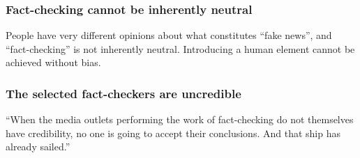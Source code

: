 \subsubsection{Fact-checking cannot be inherently neutral}

People have very different opinions about what constitutes ``fake news'', and ``fact-checking'' is not inherently neutral. Introducing a human element cannot be achieved without bias. \cite{vox_sentences_fn} \cite{inc_fb_transparency}

\subsubsection{The selected fact-checkers are uncredible}

``When the media outlets performing the work of fact-checking do not themselves have credibility, no one is going to accept their conclusions. And that ship has already sailed.'' \cite{vox_sentences_fn}

